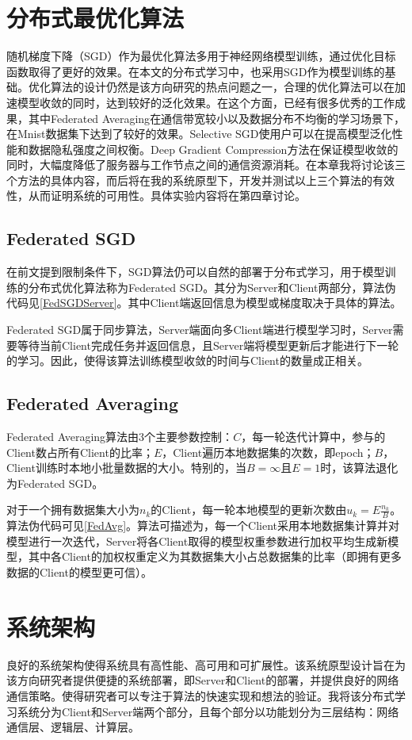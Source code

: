 \documentclass[zihao = -4,cn]{oucart}
\begin{document}
\section{分布式最优化算法}
随机梯度下降（SGD）作为最优化算法多用于神经网络模型训练，通过优化目标函数取得了更好的效果。在本文的分布式学习中，也采用SGD作为模型训练的基础。优化算法的设计仍然是该方向研究的热点问题之一，合理的优化算法可以在加速模型收敛的同时，达到较好的泛化效果。在这个方面，已经有很多优秀的工作成果，其中Federated Averaging\cite{mcmahan2016communication}在通信带宽较小以及数据分布不均衡的学习场景下，在Mnist数据集下达到了较好的效果。Selective SGD\cite{shokri2015privacy}使用户可以在提高模型泛化性能和数据隐私强度之间权衡。Deep Gradient Compression\cite{lin2017deep}方法在保证模型收敛的同时，大幅度降低了服务器与工作节点之间的通信资源消耗。在本章我将讨论该三个方法的具体内容，而后将在我的系统原型下，开发并测试以上三个算法的有效性，从而证明系统的可用性。具体实验内容将在第四章讨论。
\subsection{Federated SGD}
在前文提到限制条件下，SGD算法仍可以自然的部署于分布式学习，用于模型训练的分布式优化算法称为Federated SGD。其分为Server和Client两部分，算法伪代码见\ref{FedSGDServer}。其中Client端返回信息为模型或梯度取决于具体的算法。\par
Federated SGD属于同步算法，Server端面向多Client端进行模型学习时，Server需要等待当前Client完成任务并返回信息，且Server端将模型更新后才能进行下一轮的学习。因此，使得该算法训练模型收敛的时间与Client的数量成正相关。

\subsection{Federated Averaging}

Federated Averaging算法由3个主要参数控制：$C$，每一轮迭代计算中，参与的Client数占所有Client的比率；$E$，Client遍历本地数据集的次数，即epoch；$B$，Client训练时本地小批量数据的大小。特别的，当$B=\infty$且$E=1$时，该算法退化为Federated SGD。\par
对于一个拥有数据集大小为$n_k$的Client，每一轮本地模型的更新次数由$u_k = E\frac{n_k}{B}$。算法伪代码可见\ref{FedAvg}。算法可描述为，每一个Client采用本地数据集计算并对模型进行一次迭代，Server将各Client取得的模型权重参数进行加权平均生成新模型，其中各Client的加权权重定义为其数据集大小占总数据集的比率（即拥有更多数据的Client的模型更可信）。


\section{系统架构}
良好的系统架构使得系统具有高性能、高可用和可扩展性。该系统原型设计旨在为该方向研究者提供便捷的系统部署，即Server和Client的部署，并提供良好的网络通信策略。使得研究者可以专注于算法的快速实现和想法的验证。我将该分布式学习系统分为Client和Server端两个部分，且每个部分以功能划分为三层结构：网络通信层、逻辑层、计算层。
\end{document}
